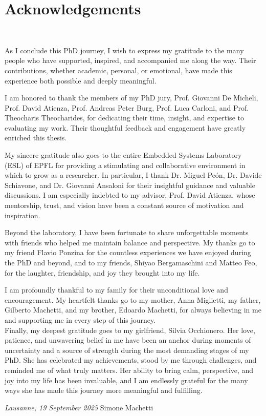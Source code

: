 \chapter*{Acknowledgements}
~\newline~\newline~
\thispagestyle{empty}

\setlength{\parskip}{1em}

    As I conclude this PhD journey, I wish to express my gratitude to the many people who have supported, inspired, and accompanied me along the way. Their contributions, whether academic, personal, or emotional, have made this experience both possible and deeply meaningful. 

    I am honored to thank the members of my PhD jury, Prof. Giovanni De Micheli, Prof. David Atienza, Prof. Andreas Peter Burg, Prof. Luca Carloni, and Prof. Theocharis Theocharides, for dedicating their time, insight, and expertise to evaluating my work. Their thoughtful feedback and engagement have greatly enriched this thesis.
    
    My sincere gratitude also goes to the entire Embedded Systems Laboratory (ESL) of EPFL for providing a stimulating and collaborative environment in which to grow as a researcher. In particular, I thank Dr. Miguel Peón, Dr. Davide Schiavone, and Dr. Giovanni Ansaloni for their insightful guidance and valuable discussions. I am especially indebted to my advisor, Prof. David Atienza, whose mentorship, trust, and vision have been a constant source of motivation and inspiration.  
    
    Beyond the laboratory, I have been fortunate to share unforgettable moments with friends who helped me maintain balance and perspective. My thanks go to my friend Flavio Ponzina for the countless experiences we have enjoyed during the PhD and beyond, and to my friends, Shiyao Bergamaschini and Matteo Feo, for the laughter, friendship, and joy they brought into my life.  
    
    I am profoundly thankful to my family for their unconditional love and encouragement. My heartfelt thanks go to my mother, Anna Miglietti, my father, Gilberto Machetti, and my brother, Edoardo Machetti, for always believing in me and supporting me in every step of this journey.\\ 
    
    Finally, my deepest gratitude goes to my girlfriend, Silvia Occhionero. Her love, patience, and unwavering belief in me have been an anchor during moments of uncertainty and a source of strength during the most demanding stages of my PhD. She has celebrated my achievements, stood by me through challenges, and reminded me of what truly matters. Her ability to bring calm, perspective, and joy into my life has been invaluable, and I am endlessly grateful for the many ways she has made this journey more meaningful and fulfilling.\\

\setlength{\parskip}{0em}

\bigskip
 
\noindent\textit{Lausanne, 19 September 2025}
\hfill Simone Machetti
